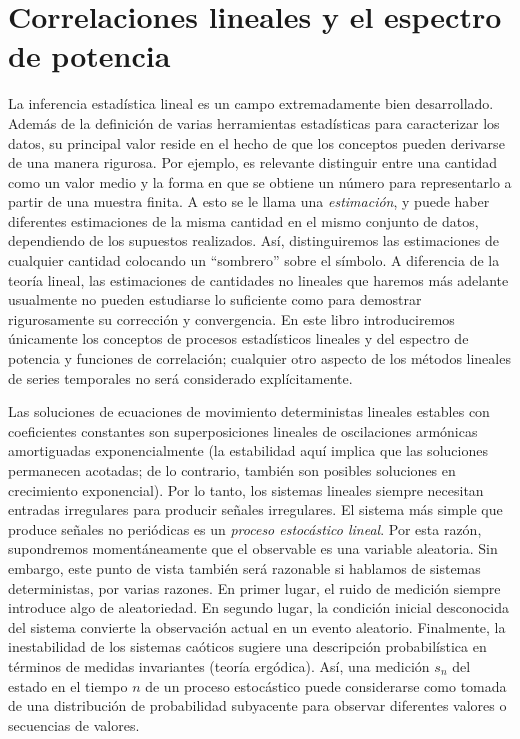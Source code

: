 \documentclass[10pt,a4paper]{book}
\begin{document}
\newpage

\section{Correlaciones lineales y el espectro de potencia}

La inferencia estadística lineal es un campo extremadamente bien desarrollado. Además de la definición de varias herramientas estadísticas para caracterizar los datos, su principal valor reside en el hecho de que los conceptos pueden derivarse de una manera rigurosa. Por ejemplo, es relevante distinguir entre una cantidad como un valor medio y la forma en que se obtiene un número para representarlo a partir de una muestra finita. A esto se le llama una \emph{estimación}, y puede haber diferentes estimaciones de la misma cantidad en el mismo conjunto de datos, dependiendo de los supuestos realizados. Así, distinguiremos las estimaciones de cualquier cantidad colocando un “sombrero” sobre el símbolo. A diferencia de la teoría lineal, las estimaciones de cantidades no lineales que haremos más adelante usualmente no pueden estudiarse lo suficiente como para demostrar rigurosamente su corrección y convergencia. En este libro introduciremos únicamente los conceptos de procesos estadísticos lineales y del espectro de potencia y funciones de correlación; cualquier otro aspecto de los métodos lineales de series temporales no será considerado explícitamente.

Las soluciones de ecuaciones de movimiento deterministas lineales estables con coeficientes constantes son superposiciones lineales de oscilaciones armónicas amortiguadas exponencialmente (la estabilidad aquí implica que las soluciones permanecen acotadas; de lo contrario, también son posibles soluciones en crecimiento exponencial). Por lo tanto, los sistemas lineales siempre necesitan entradas irregulares para producir señales irregulares. El sistema más simple que produce señales no periódicas es un \emph{proceso estocástico lineal}. Por esta razón, supondremos momentáneamente que el observable es una variable aleatoria. Sin embargo, este punto de vista también será razonable si hablamos de sistemas deterministas, por varias razones. En primer lugar, el ruido de medición siempre introduce algo de aleatoriedad. En segundo lugar, la condición inicial desconocida del sistema convierte la observación actual en un evento aleatorio. Finalmente, la inestabilidad de los sistemas caóticos sugiere una descripción probabilística en términos de medidas invariantes (teoría ergódica). Así, una medición $s_n$ del estado en el tiempo $n$ de un proceso estocástico puede considerarse como tomada de una distribución de probabilidad subyacente para observar diferentes valores o secuencias de valores.
\end{document}
